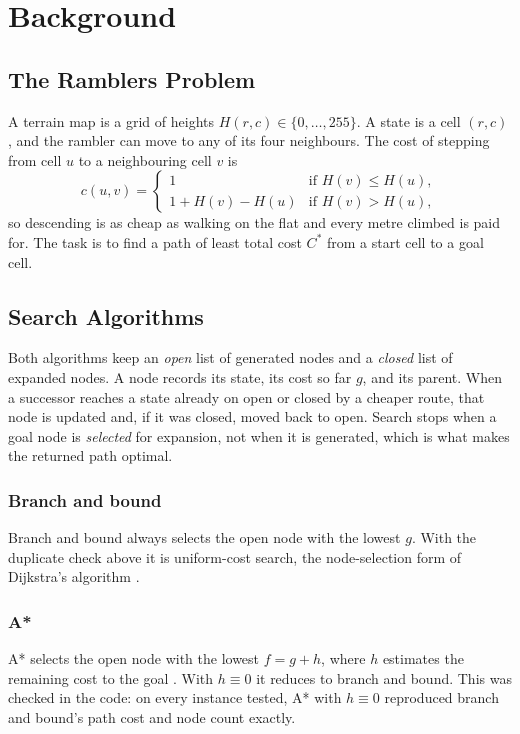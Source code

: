 \chapter{Background}
\label{ch:background}

\section{The Ramblers Problem}

A terrain map is a grid of heights $H(r,c) \in \{0,\dots,255\}$. A state is a cell $(r,c)$, and the rambler can move to any of its four neighbours. The cost of stepping from cell $u$ to a neighbouring cell $v$ is
\begin{equation}
  c(u,v) =
  \begin{cases}
    1 & \text{if } H(v) \le H(u),\\
    1 + H(v) - H(u) & \text{if } H(v) > H(u),
  \end{cases}
  \label{eq:cost}
\end{equation}
so descending is as cheap as walking on the flat and every metre climbed is paid for. The task is to find a path of least total cost $C^*$ from a start cell to a goal cell.


\section{Search Algorithms}

Both algorithms keep an \emph{open} list of generated nodes and a \emph{closed} list of expanded nodes. A node records its state, its cost so far $g$, and its parent. When a successor reaches a state already on open or closed by a cheaper route, that node is updated and, if it was closed, moved back to open. Search stops when a goal node is \emph{selected} for expansion, not when it is generated, which is what makes the returned path optimal.

\subsection{Branch and bound}
Branch and bound \citep{lawler1966branch} always selects the open node with the lowest $g$. With the duplicate check above it is uniform-cost search, the node-selection form of Dijkstra's algorithm \citep{dijkstra1959note,russell2020aima}.

\subsection{A*}
A* selects the open node with the lowest $f = g + h$, where $h$ estimates the remaining cost to the goal \citep{hart1968formal}. With $h \equiv 0$ it reduces to branch and bound. This was checked in the code: on every instance tested, A* with $h \equiv 0$ reproduced branch and bound's path cost and node count exactly.


